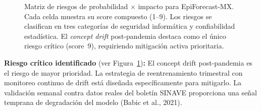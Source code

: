 \documentclass[12pt, letterpaper]{article}
\newenvironment{criticalbox}[1][]{\par\medskip\begin{lrbox}{\boxcontents}\begin{minipage}{\dimexpr\textwidth-12pt}\setlength{\emergencystretch}{5em}\setlength{\parskip}{6pt}}{\end{minipage}\end{lrbox}\noindent\colorbox{lightred}{\usebox{\boxcontents}}\par\medskip}
\newcommand{\figref}[1]{Figura~\ref{#1}}
\begin{document}
\begin{figure}[H]
{%
}
\caption[Matriz de riesgos del sistema ML.]{Matriz de riesgos de probabilidad $\times$ impacto para EpiForecast-MX. Cada celda muestra su score compuesto (1--9). Los riesgos se clasifican en tres categorías de seguridad informática y confiabilidad estadística. El \emph{concept drift} post-pandemia destaca como el único riesgo crítico (score~9), requiriendo mitigación activa prioritaria.}
\label{fig:riesgos_heatmap}
\end{figure}


\begin{criticalbox}
\textbf{Riesgo crítico identificado} (ver \figref{fig:riesgos_heatmap})\textbf{:} El concept drift post-pandemia es el riesgo de mayor prioridad. La estrategia de reentrenamiento trimestral con monitoreo continuo de drift está diseñada específicamente para mitigarlo. La validación semanal contra datos reales del boletín SINAVE proporciona una señal temprana de degradación del modelo (Babic et al., 2021).
\end{criticalbox}
\end{document}

